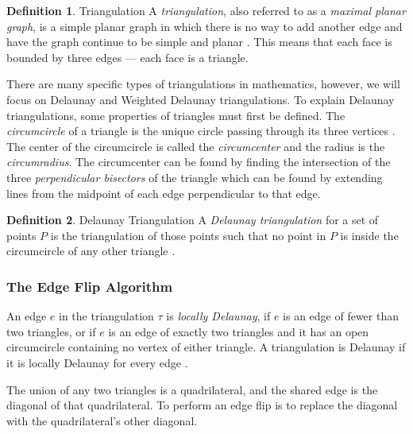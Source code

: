 \documentclass[11pt]{article}
\theoremstyle{definition}
\newtheorem{definition}{Definition}[section]
\begin{document}
	\theoremstyle{definition}
	\begin{definition}{Triangulation}
		A \emph{triangulation}, also referred to as a \emph{maximal planar graph}, is a simple planar graph in which there is no way to add another edge and have the graph continue to be simple and planar \cite{meshGeneration}. 
		This means that each face is bounded by three edges --- each face is a triangle.
	\end{definition}

	There are many specific types of triangulations in mathematics, however, we will focus on Delaunay and Weighted Delaunay triangulations. 
	To explain Delaunay triangulations, some properties of triangles must first be defined. 
	The \emph{circumcircle} of a triangle is the unique circle passing through its three vertices \cite{mathworld:Circumcenter}. 
	The center of the circumcircle is called the \emph{circumcenter} and the radius is the \emph{circumradius}. 
	The circumcenter can be found by finding the intersection of the three \emph{perpendicular bisectors} of the triangle which can be found by extending lines from the midpoint of each edge perpendicular to that edge.

  	\theoremstyle{definition}
  	\begin{definition}{Delaunay Triangulation}
		A \emph{Delaunay triangulation} for a set of points $P$ is the triangulation of those points such that no point in $P$ is inside the circumcircle of any other triangle \cite{meshGeneration}.
	\end{definition}
	
\subsubsection{The Edge Flip Algorithm}
	An edge $e$ in the triangulation $\tau$ is \emph{locally Delaunay}, if $e$ is an edge of fewer than two triangles, or if $e$ is an edge of exactly two triangles and it has an open circumcircle containing no vertex of either triangle. 
	A triangulation is Delaunay if it is locally Delaunay for every edge \cite{meshGeneration}.

	The union of any two triangles is a quadrilateral, and the shared edge is the diagonal of that quadrilateral. 
	To perform an edge flip is to replace the diagonal with the quadrilateral's other diagonal.
\end{document}
